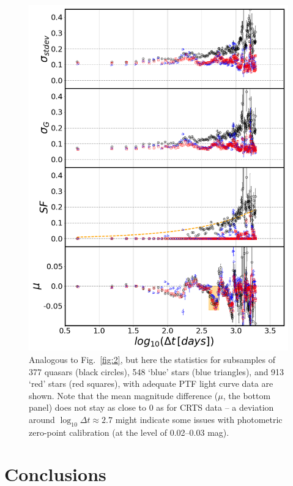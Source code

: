 \documentclass[fleqn,usenatbib]{mnras}
\begin{document}
\begin{figure}
\includegraphics[width=1.1\columnwidth, center]{Fig_6.png}
\caption{Analogous to Fig.~\ref{fig:2}, but here the statistics for subsamples of 377 quasars (black circles), 548 `blue' stars (blue triangles), and 913 `red' stars (red squares), with adequate PTF light curve data are shown. Note that the mean magnitude difference ($\mu$, the bottom panel) does not stay as close to 0 as for CRTS data -- a deviation around $\log_{10} \Delta t \approx 2.7$ might indicate some issues with photometric zero-point calibration (at the level of 0.02--0.03 mag).}
\label{fig:2PTF} 
\end{figure}



\section{Conclusions}
\end{document}
